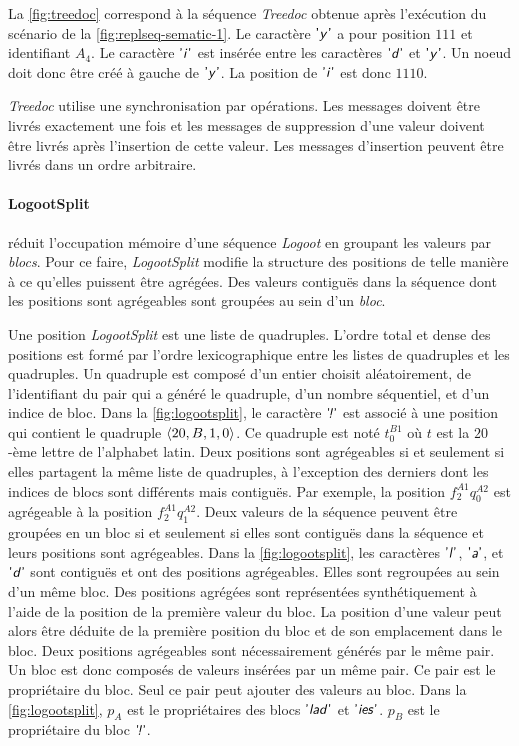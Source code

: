 La \autoref{fig:treedoc} correspond à la séquence \emph{Treedoc} obtenue après l'exécution du scénario de la \autoref{fig:replseq-sematic-1}.
Le caractère $\textsf{'\textit{y}'}$ a pour position $111$ et identifiant $A_4$.
Le caractère $\textsf{'\textit{i}'}$ est insérée entre les caractères $\textsf{'\textit{d}'}$ et $\textsf{'\textit{y}'}$.
Un noeud doit donc être créé à gauche de $\textsf{'\textit{y}'}$.
La position de $\textsf{'\textit{i}'}$ est donc $1110$.

\emph{Treedoc} utilise une synchronisation par opérations.
Les messages doivent être livrés exactement une fois et les messages de suppression d'une valeur doivent être livrés après l'insertion de cette valeur.
Les messages d'insertion peuvent être livrés dans un ordre arbitraire.


\paragraph{LogootSplit}\autocite{andre_2013_logootsplit} réduit l'occupation mémoire d'une séquence \emph{Logoot} en groupant les valeurs par \emph{blocs}.
Pour ce faire, \emph{LogootSplit} modifie la structure des positions de telle manière à ce qu'elles puissent être agrégées.
Des valeurs contiguës dans la séquence dont les positions sont agrégeables sont groupées au sein d'un \emph{bloc}.

Une position \emph{LogootSplit} est une liste de quadruples.
L'ordre total et dense des positions est formé par l'ordre lexicographique entre les listes de quadruples et les quadruples.
Un quadruple est composé d'un entier choisit aléatoirement, de l'identifiant du pair qui a généré le quadruple, d'un nombre séquentiel, et d'un indice de bloc.
Dans la \autoref{fig:logootsplit}, le caractère $\textsf{'\textit{\negthinspace!}'}$ est associé à une position qui contient le quadruple $\langle20, B, 1, 0\rangle$.
Ce quadruple est noté $t^{B1}_0$ où $t$ est la $20$-ème lettre de l'alphabet latin.
Deux positions sont agrégeables si et seulement si elles partagent la même liste de quadruples, à l'exception des derniers dont les indices de blocs sont différents mais contiguës.
Par exemple, la position $f^{A1}_2q^{A2}_0$ est agrégeable à la position $f^{A1}_2q^{A2}_1$.
Deux valeurs de la séquence peuvent être groupées en un bloc si et seulement si elles sont contiguës dans la séquence et leurs positions sont agrégeables.
Dans la \autoref{fig:logootsplit}, les caractères $\textsf{'\textit{l}'}$, $\textsf{'\textit{a}'}$, et $\textsf{'\textit{d}'}$ sont contiguës et ont des positions agrégeables.
Elles sont regroupées au sein d'un même bloc.
Des positions agrégées sont représentées synthétiquement à l'aide de la position de la première valeur du bloc.
La position d'une valeur peut alors être déduite de la première position du bloc et de son emplacement dans le bloc.
Deux positions agrégeables sont nécessairement générés par le même pair.
Un bloc est donc composés de valeurs insérées par un même pair.
Ce pair est le propriétaire du bloc.
Seul ce pair peut ajouter des valeurs au bloc.
Dans la \autoref{fig:logootsplit}, $p_A$ est le propriétaires des blocs $\textsf{'\textit{lad}'}$ et $\textsf{'\textit{ies}'}$.
$p_B$ est le propriétaire du bloc $\textsf{'\textit{\negthinspace!}'}$.

